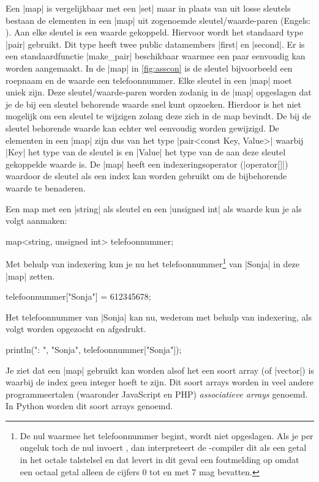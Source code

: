 \begin{cpplstShortInline}
Een |map| is vergelijkbaar met een |set| maar in plaats van uit losse sleutels bestaan de elementen in een |map| uit zogenoemde sleutel/waarde\hyp{}paren (Engels: ).
Aan elke sleutel is een waarde gekoppeld.
Hiervoor wordt het standaard type |pair| gebruikt.
Dit type heeft twee public datamembers |first| en |second|.
Er is een standaardfunctie |make_pair| beschikbaar waarmee een paar eenvoudig kan worden aangemaakt.
In de |map| in \cref{fig:asscon} is de sleutel bijvoorbeeld een roepnaam en de waarde een telefoonnummer.
Elke sleutel in een |map| moet uniek zijn.
Deze sleutel/waarde\hyp{}paren worden zodanig in de |map| opgeslagen dat je de bij een sleutel behorende waarde snel kunt opzoeken.
Hierdoor is het niet mogelijk om een sleutel te wijzigen zolang deze zich in de map bevindt.
De bij de sleutel behorende waarde kan echter wel eenvoudig worden gewijzigd.
De elementen in een |map| zijn dus van het type |pair<const Key, Value>| waarbij |Key| het type van de sleutel is en |Value| het type van de aan deze sleutel gekoppelde waarde is.
De |map| heeft een indexeringsoperator (|operator[]|) waardoor de sleutel als een index kan worden gebruikt om de bijbehorende waarde te benaderen.

Een map met een |string| als sleutel en een |unsigned int| als waarde kun je als volgt aanmaken:
\begin{cpplstfragment}
	map<string, unsigned int> telefoonnummer;
\end{cpplstfragment}
Met behulp van indexering kun je nu het telefoonnummer\footnote{%
	De nul waarmee het telefoonnummer begint, wordt niet opgeslagen.
	Als je per ongeluk toch de nul invoert , dan interpreteert de \Cpp{}\hyp{}compiler dit als een getal in het octale talstelsel en dat levert in dit geval een foutmelding op omdat een octaal getal alleen de cijfers 0 tot en met 7 mag bevatten.
} van |Sonja| in deze |map| zetten.
\begin{cpplstfragment}
	telefoonnummer["Sonja"] = 612345678;
\end{cpplstfragment}
Het telefoonnummer van |Sonja| kan nu, wederom met behulp van indexering, als volgt worden opgezocht en afgedrukt.
\begin{cpplstfragment}
	println("{}: {}", "Sonja", telefoonnummer["Sonja"]);
\end{cpplstfragment}
Je ziet dat een |map| gebruikt kan worden alsof het een soort array (of |vector|) is waarbij de index geen integer hoeft te zijn.
Dit soort arrays worden in veel andere programmeertalen (waaronder JavaScript en PHP) \emph{associatieve arrays} genoemd.
In Python worden dit soort arrays \emph{} genoemd.


\end{cpplstShortInline}
